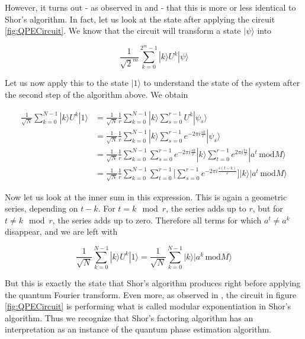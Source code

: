 \documentclass[a4paper, draft]{article}
\theoremstyle{own}
\theoremstyle{remark}
\begin{document}
However, it turns out - as observed in \cite{Kitaev} and \cite{CleveEkert} - that this is more or less identical to Shor's algorithm. In fact, let us look at the state after applying the circuit \ref{fig:QPECircuit}. We know that the circuit will transform a state $|\psi \rangle$ into 

$$
\frac{1}{\sqrt{2}^m} \sum_{k = 0}^{2^m - 1}  |k \rangle U^k |\psi \rangle
$$

Let us now apply this to the state $|1 \rangle$ to understand the state of the system after the second step of the algorithm above. We obtain

\begin{align*}
\frac{1}{\sqrt{N}} \sum_{k = 0}^{N-1} |k \rangle U^k |1 \rangle &=
\frac{1}{\sqrt{N}} \frac{1}{r} \sum_{k=0}^{N-1} |k \rangle \sum_{s=0}^{r-1} U^k |\psi_s \rangle \\
&= \frac{1}{\sqrt{N}} \frac{1}{r} \sum_{k=0}^{N-1} |k \rangle \sum_{s=0}^{r-1} e^{-2\pi i \frac{sk}{r}} |\psi_s \rangle \\
&= \frac{1}{\sqrt{N}} \frac{1}{r} \sum_{k=0}^{N-1} \sum_{s=0}^{r-1} e^{-2\pi i \frac{sk}{r}} |k \rangle \sum_{t=0}^{r-1} e^{2\pi i \frac{ts}{r}} |a^t \, \text{mod} M \rangle \\
&= \frac{1}{\sqrt{N}} \frac{1}{r}  \sum_{k=0}^{N-1} \sum_{t=0}^{r-1}    \big[ \sum_{s=0}^{r-1}  e^{-2\pi i \frac{s(t-k)}{r}} \big] |k \rangle |a^t \, \text{mod} M \rangle
\end{align*} 

Now let us look at the inner sum in this expression. This is again a geometric series, depending on $t-k$. For $t=k \mod r$, the series adds up to $r$, but for $t \neq k \mod r$, the series adds up to zero. Therefore all terms for which $a^t \neq a^k$ disappear, and we are left with

$$
\frac{1}{\sqrt{N}} \sum_{k = 0}^{N-1} |k \rangle U^k |1 \rangle 
= 
\frac{1}{\sqrt{N}} \sum_{k=0}^{N-1} |k \rangle |a^k \, \text{mod} M \rangle
$$

But this is exactly the state that Shor's algorithm produces right before applying the quantum Fourier transform. Even more, as observed in \cite{CleveEkert}, the circuit in figure \ref{fig:QPECircuit} is performing what is called modular exponentiation in Shor's algorithm. Thus we recognize that Shor's factoring algorithm has an interpretation as an instance of the quantum phase estimation algorithm.



\end{document}
